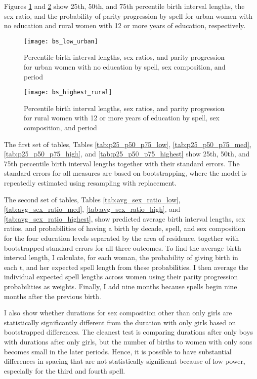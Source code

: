 \documentclass[12pt,letterpaper]{article}
\begin{document}
Figures \ref{fig:spacing_low_urban} and \ref{fig:spacing_highest_rural} show 25th, 50th,
and 75th percentile birth interval lengths, the sex ratio, and the probability of parity
progression by spell for urban women with no education and rural women with 12 or
more years of education, respectively.

\begin{figure}
\centering
\texttt{[image: bs\_low\_urban]}
\caption{Percentile birth interval lengths, sex ratios, and parity progression  
for urban women with no education by spell, sex composition, and period}
\label{fig:spacing_low_urban}
\end{figure}

\begin{figure}
\centering
\texttt{[image: bs\_highest\_rural]}
\caption{Percentile birth interval lengths, sex ratios, and parity progression  
for rural women with 12 or more years of education by spell, sex composition, and period}
\label{fig:spacing_highest_rural}
\end{figure}



The first set of tables, Tables \ref{tab:p25_p50_p75_low}, \ref{tab:p25_p50_p75_med},
\ref{tab:p25_p50_p75_high}, and \ref{tab:p25_p50_p75_highest} show 25th, 50th, and
75th percentile birth interval lengths together with their standard errors.
The standard errors for all measures are based on bootstrapping,
where the model is repeatedly estimated using resampling with replacement.

The second set of tables, 
Tables \ref{tab:avg_sex_ratio_low}, \ref{tab:avg_sex_ratio_med}, 
\ref{tab:avg_sex_ratio_high}, and \ref{tab:avg_sex_ratio_highest}, show predicted average 
birth interval lengths, sex ratios, and probabilities of having a birth by decade, spell, and sex 
composition for the four education levels separated by the area of residence, together 
with bootstrapped standard errors for all three outcomes.
To find the average birth interval length, I calculate, for each woman, the probability of 
giving birth in each $t$, and her expected spell length from these probabilities. 
I then average the individual expected spell lengths across women using their parity 
progression probabilities as weights. Finally, I add nine months because spells begin 
nine months after the previous birth.

I also show whether durations for sex composition other than only girls are statistically 
significantly different from the duration with only girls based on bootstrapped 
differences. 
The cleanest test is comparing durations after only boys with durations after
only girls, but the number of births to women with only sons becomes small 
in the later periods.
Hence, it is possible to have substantial differences in spacing that are
not statistically significant because of low power, especially for the third 
and fourth spell.
\end{document}
